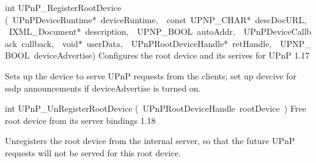 \documentclass{article}
\begin{document}
\begin{cxxentry}
\begin{cxxfunction}
\begin{cxxdoc}
\end{cxxdoc}
\end{cxxfunction}
\begin{cxxfunction}
{int}
        {UPnP\_RegisterRootDevice}
        {(\ UPnPDeviceRuntime*\ deviceRuntime,\ \ const\ UPNP\_CHAR*\ descDocURL,\ \ IXML\_Document*\ description,\ \ UPNP\_BOOL\ autoAddr,\ \ UPnPDeviceCallback\ callback,\ \ void*\ userData,\ \ UPnPRootDeviceHandle*\ retHandle,\ \ UPNP\_BOOL\ deviceAdvertise)}
        {Configures the root device and its serives for UPnP }
        {1.17}
\begin{cxxdoc}
Sets up the device to serve UPnP requests from the clients; set up
devcive for ssdp announcements if deviceAdvertise is turned on.


\end{cxxdoc}
\end{cxxfunction}
\begin{cxxfunction}
{int}
        {UPnP\_UnRegisterRootDevice}
        {(\ UPnPRootDeviceHandle\ rootDevice\ )}
        {Free root device from its server bindings }
        {1.18}
\begin{cxxdoc}
Unregisters the root device from the internal server, so that the future
UPnP requests will not be served for this root device.




\end{cxxdoc}
\end{cxxfunction}
\end{cxxentry}
\end{document}
